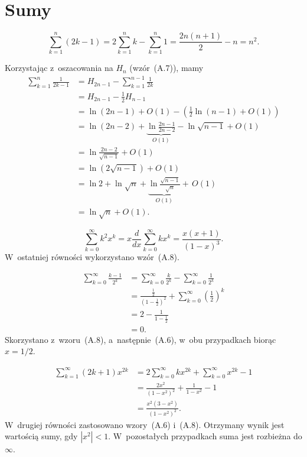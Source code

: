 \chapter{Sumy}


\exercise{} %
\[
	\sum_{k=1}^n(2k-1) = 2\sum_{k=1}^nk-\sum_{k=1}^n1 = \frac{2n(n+1)}{2}-n = n^2.
\]

\exercise{} %
\noindent Korzystając z~oszacowania na $H_n$ (wzór~(A.7)), mamy
\begin{align*}
	\sum_{k=1}^n\frac{1}{2k-1} &= H_{2n-1}-\sum_{k=1}^{n-1}\frac{1}{2k} \\
	&= H_{2n-1}-\frac{1}{2}H_{n-1} \\
	&= \ln (2n-1)+O(1)-\left(\frac{1}{2}\ln(n-1)+O(1)\right) \\
	&= \ln (2n-2)+\underbrace{\ln\frac{2n-1}{2n-2}}_{O(1)}-\ln\sqrt{n-1}+O(1) \\
	&= \ln\frac{2n-2}{\sqrt{n-1}}+O(1) \\
	&= \ln\left(2\sqrt{n-1}\right)+O(1) \\
	&= \ln 2+\ln\sqrt{n}+\underbrace{\ln\frac{\sqrt{n-1}}{\sqrt{n}}}_{O(1)}+\,O(1) \\
	&= \ln\sqrt{n}+O(1).
\end{align*}

\exercise{} %
\[
	\sum_{k=0}^\infty k^2x^k = x\frac{d}{dx}\sum_{k=0}^\infty kx^k = \frac{x(x+1)}{(1-x)^3}.
\]
W~ostatniej równości wykorzystano wzór~(A.8).

\exercise{} %
\begin{align*}
	\sum_{k=0}^\infty\frac{k-1}{2^k} &= \sum_{k=0}^\infty\frac{k}{2^k}-\sum_{k=0}^\infty\frac{1}{2^k} \\
	&= \frac{\frac{1}{2}}{\left(1-\frac{1}{2}\right)^2}+\sum_{k=0}^\infty\left(\frac{1}{2}\right)^k \\
	&= 2-\frac{1}{1-\frac{1}{2}} \\
	&= 0.
\end{align*}
Skorzystano z~wzoru~(A.8), a~następnie~(A.6), w~obu przypadkach biorąc $x=1/2$.

\exercise{} %
\begin{align*}
	\sum_{k=1}^\infty(2k+1)x^{2k} &= 2\sum_{k=0}^\infty kx^{2k}+\sum_{k=0}^\infty x^{2k}-1 \\
	&= \frac{2x^2}{(1-x^2)^2}+\frac{1}{1-x^2}-1 \\[1mm]
	&= \frac{x^2(3-x^2)}{(1-x^2)^2}.
\end{align*}
W~drugiej równości zastosowano wzory~(A.6) i~(A.8). Otrzymany wynik jest wartością sumy, gdy $|x^2|<1$. W~pozostałych przypadkach suma jest rozbieżna do $\infty$.

